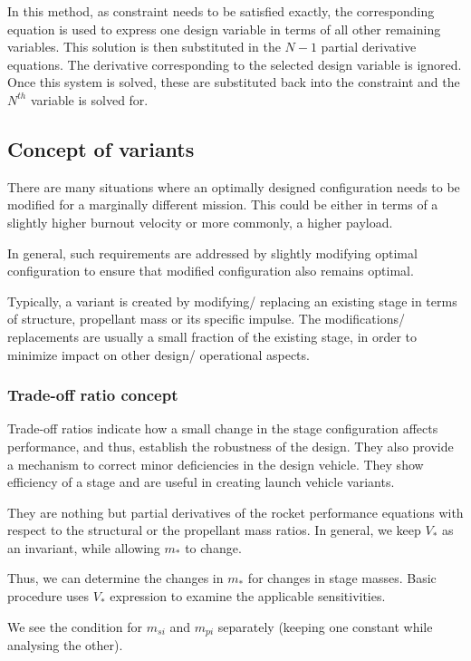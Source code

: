 \documentclass{article}
\theoremstyle{definition}
\begin{document}
In this method, as constraint needs to be satisfied exactly, the corresponding equation is used to express one design variable in terms of all other remaining variables.
This solution is then substituted in the $N-1$ partial derivative equations.
The derivative corresponding to the selected design variable is ignored.
Once this system is solved, these are substituted back into the constraint and the $N^{th}$ variable is solved for.

\subsection{Concept of variants}

There are many situations where an optimally designed configuration needs to be modified for a marginally different mission. 
This could be either in terms of a slightly higher burnout velocity or more commonly, a higher payload.

In general, such requirements are addressed by slightly modifying optimal configuration to ensure that modified configuration also remains optimal.

Typically, a variant is created by modifying/ replacing an existing stage in terms of structure, propellant mass or its specific impulse.
The modifications/ replacements are usually a small fraction of the existing stage, in order to minimize impact on other design/ operational aspects.

\subsubsection{Trade-off ratio concept}

Trade-off ratios indicate how a small change in the stage configuration affects performance, and thus, establish the robustness of the design.
They also provide a mechanism to correct minor deficiencies in the design vehicle.
They show efficiency of a stage and are useful in creating launch vehicle variants.

They are nothing but partial derivatives of the rocket performance equations with respect to the structural or the propellant mass ratios.
In general, we keep $V_*$ as an invariant, while allowing $m_*$ to change.

Thus, we can determine the changes in $m_*$ for changes in stage masses.
Basic procedure uses $V_*$ expression to examine the applicable sensitivities.

We see the condition for $m_{si}$ and $m_{pi}$ separately (keeping one constant while analysing the other).
\end{document}
